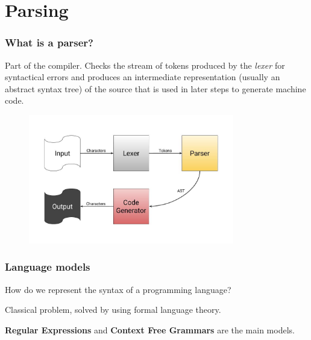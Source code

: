 \section{Parsing}
\begin{frame}
	\frametitle{What is a parser?}
    \begin{block}{}
        
        Part of the compiler.
        Checks the stream of tokens produced by the \emph{lexer} for syntactical errors
        and produces an intermediate representation (usually an abstract syntax tree) of the source 
        that is used in later steps to generate machine code.
    \end{block}
    \begin{figure}
        \includegraphics[width=0.8\textwidth,height=.6\textheight]{img/parser.jpg}
    \end{figure}
\end{frame}
\begin{frame}
    \frametitle{Language models}
    
    \begin{block}{}How do we represent the syntax of a programming language?\end{block}

    \begin{block}{}Classical problem, solved by using formal language theory.\end{block}


    \begin{block}{}{\textbf{Regular Expressions} and \textbf{Context Free Grammars } are the main models.}\end{block}

\end{frame}
